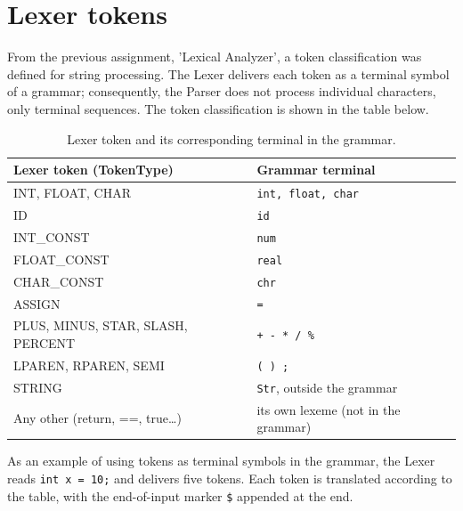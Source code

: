 \documentclass[12pt,letterpaper]{article}
\newcommand{\cod}[1]{\texttt{#1}} %
\newcommand{\anchotabla}{0.9\textwidth} %
\begin{document}
\section{Lexer tokens}
From the previous assignment, 'Lexical Analyzer', a token classification was defined for string processing. The Lexer delivers each token as a terminal symbol of a grammar; consequently, the Parser does not process individual characters, only terminal sequences. The token classification is shown in the table below.

\begin{table}[H]
\centering
\renewcommand{\arraystretch}{1.2}
\begin{tabular}{@{}p{0.48\dimexpr\anchotabla} p{0.48\dimexpr\anchotabla}@{}}
\toprule
\textbf{Lexer token (TokenType)} & \textbf{Grammar terminal} \\
\midrule
INT, FLOAT, CHAR & \cod{int, float, char} \\
ID & \cod{id} \\
INT\_CONST & \cod{num} \\
FLOAT\_CONST & \cod{real} \\
CHAR\_CONST & \cod{chr} \\
ASSIGN & \cod{=} \\
PLUS, MINUS, STAR, SLASH, PERCENT & \cod{+ - * / \%} \\
LPAREN, RPAREN, SEMI & \cod{( ) ;} \\
STRING & \cod{Str}, outside the grammar \\
Any other (return, ==, true\ldots) & its own lexeme (not in the grammar) \\
\bottomrule
\end{tabular}
\caption{Lexer token and its corresponding terminal in the grammar.}\label{tab:tokens}
\end{table}

As an example of using tokens as terminal symbols in the grammar, the Lexer reads \lstinline|int x = 10;| and delivers five tokens. Each token is translated according to the table, with the end-of-input marker \texttt{\$} appended at the end.
\end{document}

